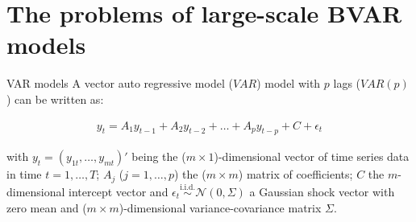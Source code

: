 \section{The problems of large-scale BVAR models}

\begin{frame}{VAR models}
    A vector auto regressive model ($VAR$) model with $p$ lags ($VAR(p)$) can be written as:

    \begin{align}
        y_t = A_1 y_{t - 1} + A_2 y_{t - 2} + \dots + A_p y_{t - p} + C + \epsilon_t
    \end{align}

    with $y_t = (y_{1 t} , \dots , y_{m t})'$ being the ($m \times 1$)-dimensional vector of time series data in time $t = 1 , \dots , T$; $A_j$ ($j = 1 , \dots , p$) the ($m \times m$) matrix of coefficients; $C$ the $m$-dimensional intercept vector and $\epsilon_t \overset{\text{i.i.d.}}{\sim} \mathcal{N}(0, \Sigma)$ a Gaussian shock vector with zero mean and ($m \times m$)-dimensional variance-covariance matrix $\Sigma$.\\~\\
\end{frame}

